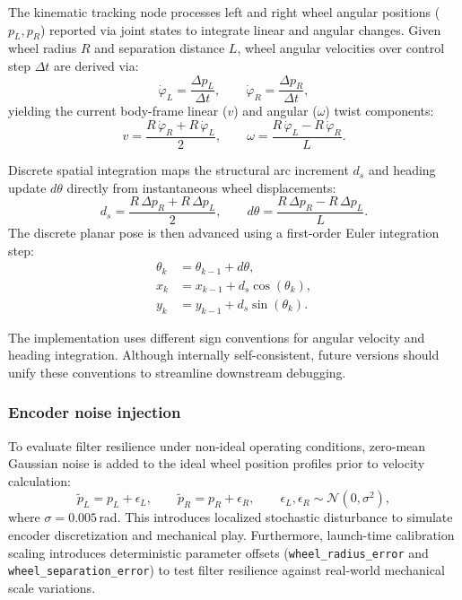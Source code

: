 The kinematic tracking node processes left and right wheel angular positions ($p_L, p_R$) reported via joint states to integrate linear and angular changes. Given wheel radius $R$ and separation distance $L$, wheel angular velocities over control step $\Delta t$ are derived via:
\begin{equation}
\dot{\varphi}_L = \frac{\Delta p_L}{\Delta t}, \qquad
\dot{\varphi}_R = \frac{\Delta p_R}{\Delta t},
\label{eq:wheel_vel}
\end{equation}
yielding the current body-frame linear ($v$) and angular ($\omega$) twist components:
\begin{equation}
v = \frac{R\,\dot{\varphi}_R + R\,\dot{\varphi}_L}{2}, \qquad
\omega = \frac{R\,\dot{\varphi}_L - R\,\dot{\varphi}_R}{L}.
\label{eq:twist}
\end{equation}

Discrete spatial integration maps the structural arc increment $d_s$ and heading update $d\theta$ directly from instantaneous wheel displacements:
\begin{equation}
d_s = \frac{R\,\Delta p_R + R\,\Delta p_L}{2}, \qquad
d\theta = \frac{R\,\Delta p_R - R\,\Delta p_L}{L}.
\label{eq:increments}
\end{equation}
The discrete planar pose is then advanced using a first-order Euler integration step:
\begin{align}
\theta_k &= \theta_{k-1} + d\theta, \label{eq:theta_update}\\
x_k &= x_{k-1} + d_s \cos(\theta_k), \label{eq:x_update}\\
y_k &= y_{k-1} + d_s \sin(\theta_k). \label{eq:y_update}
\end{align}

The implementation uses different sign conventions for angular velocity and heading integration. Although internally self-consistent, future versions should unify these conventions to streamline downstream debugging.

\subsubsection{Encoder noise injection}

To evaluate filter resilience under non-ideal operating conditions, zero-mean Gaussian noise is added to the ideal wheel position profiles prior to velocity calculation:
\begin{equation}
\tilde{p}_L = p_L + \epsilon_L, \qquad \tilde{p}_R = p_R + \epsilon_R,
\qquad \epsilon_L, \epsilon_R \sim \mathcal{N}(0, \sigma^2),
\end{equation}
where $\sigma = 0.005$\,rad. This introduces localized stochastic disturbance to simulate encoder discretization and mechanical play. Furthermore, launch-time calibration scaling introduces deterministic parameter offsets (\texttt{wheel\_radius\_error} and \texttt{wheel\_separation\_error}) to test filter resilience against real-world mechanical scale variations.

